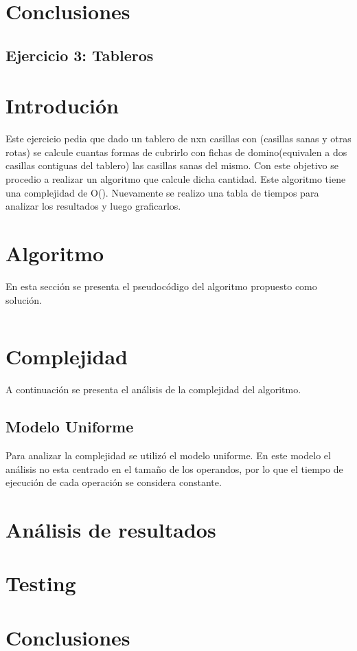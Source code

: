 \documentclass[a4paper, 12pt] {article}
\begin{document}
\section*{Conclusiones}
\newpage

\begin{center}
 \section*{Ejercicio 3: Tableros}
\end{center}

\bigskip
\section*{Introduci\'on}
Este ejercicio pedia que dado un tablero de nxn casillas con (casillas sanas y otras rotas) se calcule cuantas formas de cubrirlo con fichas de domino(equivalen a dos casillas contiguas del tablero) las casillas sanas del mismo.
Con este objetivo se procedio a realizar un algoritmo que calcule dicha cantidad. Este algoritmo tiene una complejidad de O(). Nuevamente se realizo una tabla de tiempos para analizar los resultados y luego graficarlos. 
\section*{Algoritmo}
En esta secci\'on se presenta el pseudoc\'odigo del algoritmo propuesto como soluci\'on.
\begin{verbatim}
\end{verbatim}

\section*{Complejidad}
A continuaci\'on se presenta el an\'alisis de la complejidad del algoritmo.
\subsection*{Modelo Uniforme}
Para analizar la complejidad se utiliz\'o el modelo uniforme. En este modelo el an\'alisis no esta centrado en el tama\~{n}o de los operandos, por lo que el tiempo de ejecuci\'on de cada operaci\'on se considera constante.

\section*{An\'alisis de resultados}

\section*{Testing}

\begin{comment}
\begin{center}
\includegraphicx[width=0.7\textwidth]{Plots/Ej1-Complejidad.png}
\begin{center}
FiguraX
\end{center}
\end{center}
\end{comment}
\section*{Conclusiones}
\end{document}
